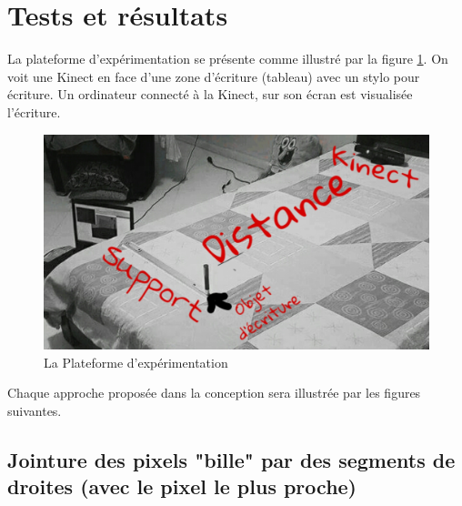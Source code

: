 \documentclass[12pt,a4paper,oneside]{book}
\begin{document}
	
	\section{Tests et résultats}
	
	La plateforme d'expérimentation se présente comme illustré par la figure \ref{fig15}. On voit une Kinect en face d'une zone d'écriture (tableau) avec un stylo pour écriture. Un ordinateur connecté à la Kinect, sur son écran est visualisée l'écriture.
	
	
	\begin{figure}[H]	
		\centering
		\includegraphics[scale=0.35]{images/exp.jpg}
		\caption{La Plateforme d'expérimentation}
		\label{fig15}
	\end{figure}
	
	
	Chaque approche proposée dans la conception sera illustrée par les figures suivantes.
	
	\subsection{Jointure des pixels "bille" par des segments de droites (avec le pixel le plus proche)}
	
\end{document}
